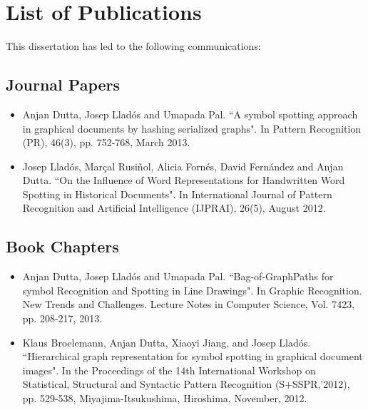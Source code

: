 \chapter*{List of Publications}

This dissertation has led to the following communications:

\section*{Journal Papers}

\begin{itemize}

\item Anjan Dutta, Josep Lladós and Umapada Pal. ``A symbol spotting approach in graphical documents by hashing serialized graphs". In Pattern Recognition (PR), 46(3), pp. 752-768, March 2013.
\vspace*{.3cm}

\item Josep Lladós, Marçal Rusiñol, Alicia Fornés, David Fernández and Anjan Dutta. ``On the Influence of Word Representations for Handwritten Word Spotting in Historical Documents". In International Journal of Pattern Recognition and Artificial Intelligence (IJPRAI), 26(5), August 2012.
\vspace*{.3cm}

\end{itemize}

\section*{Book Chapters}

\begin{itemize}

\item Anjan Dutta, Josep Lladós and Umapada Pal. ``Bag-of-GraphPaths for symbol Recognition and Spotting in Line Drawings". In Graphic Recognition. New Trends and Challenges. Lecture Notes in Computer Science, Vol. 7423, pp. 208-217, 2013.
\vspace*{.3cm}

\item Klaus Broelemann, Anjan Dutta, Xiaoyi Jiang, and Josep Lladós. ``Hierarchical graph representation for symbol spotting in graphical document images". In the Proceedings of the 14th International Workshop on Statistical, Structural and Syntactic Pattern Recognition (S+SSPR,'2012), pp. 529-538, Miyajima-Itsukushima, Hiroshima, November, 2012.
\vspace*{.3cm}

\end{itemize}

